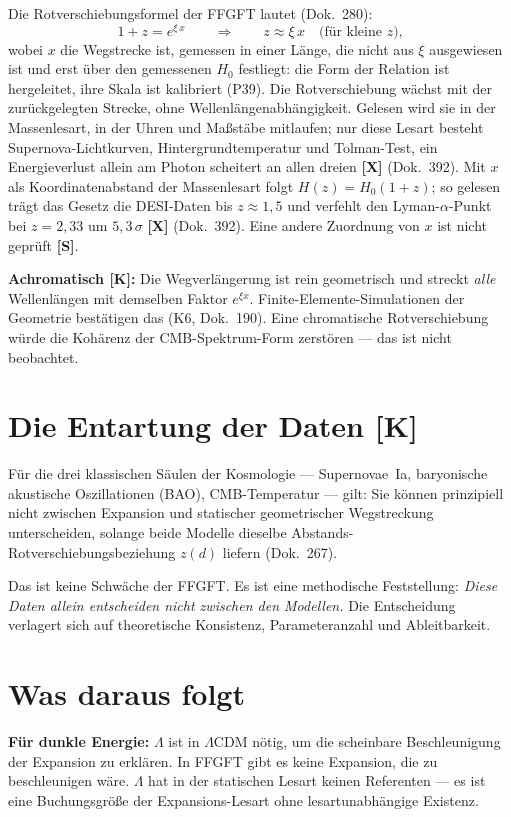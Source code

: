 Die Rotverschiebungsformel der FFGFT lautet (Dok.~280):
\[
  1 + z = e^{\xi\, x}
  \qquad\Longrightarrow\qquad
  z \approx \xi\, x \quad\text{(für kleine }z\text{),}
\]
wobei $x$ die Wegstrecke ist, gemessen in einer Länge, die nicht aus
$\xi$ ausgewiesen ist und erst über den gemessenen $H_0$ festliegt: die
Form der Relation ist hergeleitet, ihre Skala ist kalibriert (P39). Die Rotverschiebung wächst mit der
zurückgelegten Strecke, ohne Wellenlängenabhängigkeit. Gelesen wird sie in der
Massenlesart, in der Uhren und Maßstäbe mitlaufen; nur diese Lesart besteht
Supernova-Lichtkurven, Hintergrundtemperatur und Tolman-Test, ein
Energieverlust allein am Photon scheitert an allen dreien \textbf{[X]} (Dok.~392).
Mit $x$ als Koordinatenabstand der Massenlesart folgt $H(z)=H_0(1+z)$; so
gelesen trägt das Gesetz die DESI-Daten bis $z\approx1{,}5$ und verfehlt den
Lyman-$\alpha$-Punkt bei $z=2{,}33$ um $5{,}3\,\sigma$ \textbf{[X]} (Dok.~392).
Eine andere Zuordnung von $x$ ist nicht geprüft \textbf{[S]}.

\textbf{Achromatisch [K]:} Die Wegverlängerung ist rein geometrisch und
streckt \emph{alle} Wellenlängen mit demselben Faktor $e^{\xi x}$.
Finite-Elemente-Simulationen der Geometrie bestätigen das (K6, Dok.~190).
Eine chromatische Rotverschiebung würde die Kohärenz der CMB-Spektrum-Form
zerstören — das ist nicht beobachtet.

\section{Die Entartung der Daten [K]}

Für die drei klassischen Säulen der Kosmologie — Supernovae~Ia,
baryonische akustische Oszillationen (BAO), CMB-Temperatur — gilt:
Sie können prinzipiell nicht zwischen Expansion und statischer
geometrischer Wegstreckung unterscheiden, solange beide Modelle dieselbe
Abstands-Rotverschiebungsbeziehung $z(d)$ liefern (Dok.~267).

Das ist keine Schwäche der FFGFT. Es ist eine methodische Feststellung:
\emph{Diese Daten allein entscheiden nicht zwischen den Modellen.}
Die Entscheidung verlagert sich auf theoretische Konsistenz,
Parameteranzahl und Ableitbarkeit.

\section{Was daraus folgt}

\textbf{Für dunkle Energie:} $\Lambda$ ist in $\Lambda$CDM nötig, um die
scheinbare Beschleunigung der Expansion zu erklären. In FFGFT gibt es
keine Expansion, die zu beschleunigen wäre. $\Lambda$ hat in der
statischen Lesart keinen Referenten — es ist eine Buchungsgröße der
Expansions-Lesart ohne lesartunabhängige Existenz.

